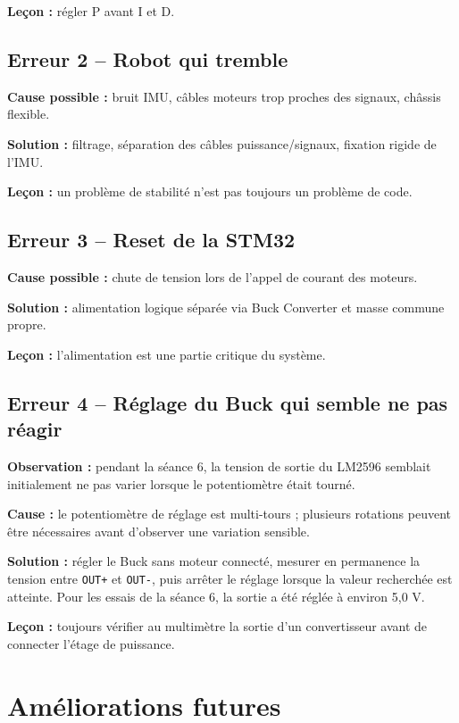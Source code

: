\documentclass[11pt,a4paper]{article}
\begin{document}
	\textbf{Leçon :} régler P avant I et D.
	
	\subsection*{Erreur 2 -- Robot qui tremble}
	
	\textbf{Cause possible :} bruit IMU, câbles moteurs trop proches des signaux, châssis flexible.
	
	\textbf{Solution :} filtrage, séparation des câbles puissance/signaux, fixation rigide de l'IMU.
	
	\textbf{Leçon :} un problème de stabilité n'est pas toujours un problème de code.
	
	\subsection*{Erreur 3 -- Reset de la STM32}
	
	\textbf{Cause possible :} chute de tension lors de l'appel de courant des moteurs.
	
	\textbf{Solution :} alimentation logique séparée via Buck Converter et masse commune propre.
	
	\textbf{Leçon :} l'alimentation est une partie critique du système.
	
	\subsection*{Erreur 4 -- Réglage du Buck qui semble ne pas réagir}
	
	\textbf{Observation :} pendant la séance 6, la tension de sortie du LM2596 semblait initialement ne pas varier lorsque le potentiomètre était tourné.
	
	\textbf{Cause :} le potentiomètre de réglage est multi-tours ; plusieurs rotations peuvent être nécessaires avant d'observer une variation sensible.
	
	\textbf{Solution :} régler le Buck sans moteur connecté, mesurer en permanence la tension entre \texttt{OUT+} et \texttt{OUT-}, puis arrêter le réglage lorsque la valeur recherchée est atteinte. Pour les essais de la séance 6, la sortie a été réglée à environ 5,0 V.
	
	\textbf{Leçon :} toujours vérifier au multimètre la sortie d'un convertisseur avant de connecter l'étage de puissance.
	
	\section{Améliorations futures}
	
\end{document}
